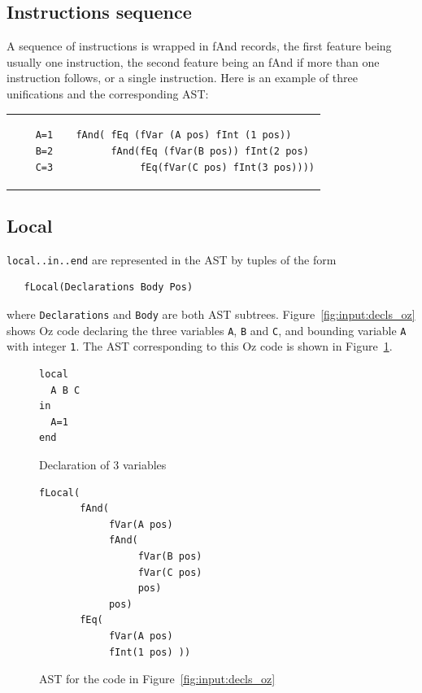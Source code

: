 \documentclass[a4paper]{memoir}
\begin{document}
\subsection{Instructions sequence}
A sequence of instructions is wrapped in fAnd records, the first feature being usually one instruction, the second feature being an fAnd if more than one instruction follows,  or a single instruction. 
Here is an example of three unifications and the corresponding AST:\\
\begin{tabular}{ p{} p{} }
  \begin{lstlisting}
    A=1
    B=2
    C=3
  \end{lstlisting}
&
  \footnotesize{
  \begin{lstlisting}
  fAnd( fEq (fVar (A pos) fInt (1 pos))
        fAnd(fEq (fVar(B pos)) fInt(2 pos) 
             fEq(fVar(C pos) fInt(3 pos))))
  \end{lstlisting}
  }
\end{tabular}

\subsection{Local}\label{sec:input:flocal}
\lstinline!local..in..end! are represented in the AST by tuples of the form
\begin{lstlisting}
   fLocal(Declarations Body Pos)
\end{lstlisting}
where \lstinline!Declarations! and
\lstinline!Body! are both AST subtrees. 
Figure~\ref{fig:input:decls_oz} shows Oz code declaring the three variables
\lstinline!A!, \lstinline!B!
and \lstinline!C!, and bounding variable \lstinline!A! with integer
\lstinline!1!. The AST corresponding to this Oz code is shown in
Figure~\ref{fig:input:decls}.

\begin{figure}
\begin{lstlisting}
local
  A B C
in
  A=1
end
\end{lstlisting}
\caption{Declaration of 3 variables}
\label{fig:input:decls_oz}
\begin{lstlisting}
fLocal(
       fAnd(
            fVar(A pos) 
            fAnd(
                 fVar(B pos) 
                 fVar(C pos) 
                 pos) 
            pos) 
       fEq( 
            fVar(A pos) 
            fInt(1 pos) ))
\end{lstlisting}
\caption{AST for the code in Figure~\ref{fig:input:decls_oz}}
\label{fig:input:decls}
\end{figure}
\end{document}
